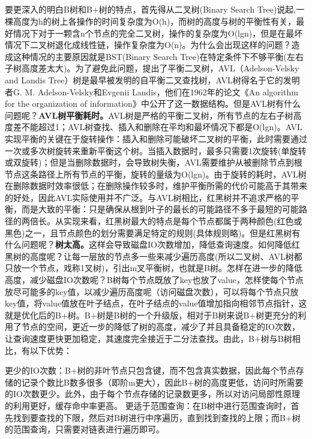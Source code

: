 \documentclass[../../../interview-questions.tex]{subfiles}
\begin{document}
\subsection{\color{red}{B树和B+树是解决什么样的问题的，怎样演化过来，之间区别}}

要更深入的明白B树和B+树的特点，首先得从二叉树(Binary Search Tree)说起,一棵高度为h的树上各操作的时间复杂度为O(h)，而树的高度与树的平衡性有关，最好情况下对于一颗含n个节点的完全二叉树，操作的复杂度为O(lgn)，但是在最坏情况下二叉树退化成线性链，操作复杂度为O(n)。为什么会出现这样的问题？造成这种情况的主要原因就是BST(Binary Search Tree)在特定条件下不够平衡(左右子树高度差太大)。为了避免此问题，提出了平衡二叉树，AVL（Adelson-Velsky and Landis Tree）树是最早被发明的自平衡二叉查找树，AVL树得名于它的发明者G. M. Adelson-Velsky和Evgenii Landis，他们在1962年的论文《An algorithm for the organization of information》中公开了这一数据结构。但是AVL树有什么问题呢？\textbf{AVL树平衡耗时。}AVL树是严格的平衡二叉树，所有节点的左右子树高度差不能超过1；AVL树查找、插入和删除在平均和最坏情况下都是O(lgn)。AVL实现平衡的关键在于旋转操作：插入和删除可能破坏二叉树的平衡，此时需要通过一次或多次树旋转来重新平衡这个树。当插入数据时，最多只需要1次旋转(单旋转或双旋转)；但是当删除数据时，会导致树失衡，AVL需要维护从被删除节点到根节点这条路径上所有节点的平衡，旋转的量级为O(lgn)。由于旋转的耗时，AVL树在删除数据时效率很低；在删除操作较多时，维护平衡所需的代价可能高于其带来的好处，因此AVL实际使用并不广泛。与AVL树相比，红黑树并不追求严格的平衡，而是大致的平衡：只是确保从根到叶子的最长的可能路径不多于最短的可能路径的两倍长。从实现来看，红黑树最大的特点是每个节点都属于两种颜色(红色或黑色)之一，且节点颜色的划分需要满足特定的规则(具体规则略)。但是红黑树有什么问题呢？\textbf{树太高。}这样会导致磁盘IO次数增加，降低查询速度。如何降低红黑树的高度呢？让每一层放的节点多一些来减少遍历高度(所以二叉树、AVL树都只放一个节点，戏称1叉树)，引出m叉平衡树，也就是B树。怎样在进一步的降低高度，减少磁盘IO次数呢？B树每个节点既放了key也放了value，怎样使每个节点放尽可能多的key值，以减少遍历高度呢（访问磁盘次数），可以将每个节点只放key值，将value值放在叶子结点，在叶子结点的value值增加指向相邻节点指针，这就是优化后的B+树。B+树是B树的一个升级版，相对于B树来说B+树更充分的利用了节点的空间，更近一步的降低了树的高度，减少了并且具备稳定的IO次数，让查询速度更快更加稳定，其速度完全接近于二分法查找。由此，B+树与B树相比，有以下优势：

更少的IO次数：B+树的非叶节点只包含键，而不包含真实数据，因此每个节点存储的记录个数比B数多很多（即阶m更大），因此B+树的高度更低，访问时所需要的IO次数更少。此外，由于每个节点存储的记录数更多，所以对访问局部性原理的利用更好，缓存命中率更高。
更适于范围查询：在B树中进行范围查询时，首先找到要查找的下限，然后对B树进行中序遍历，直到找到查找的上限；而B+树的范围查询，只需要对链表进行遍历即可。
\end{document}
